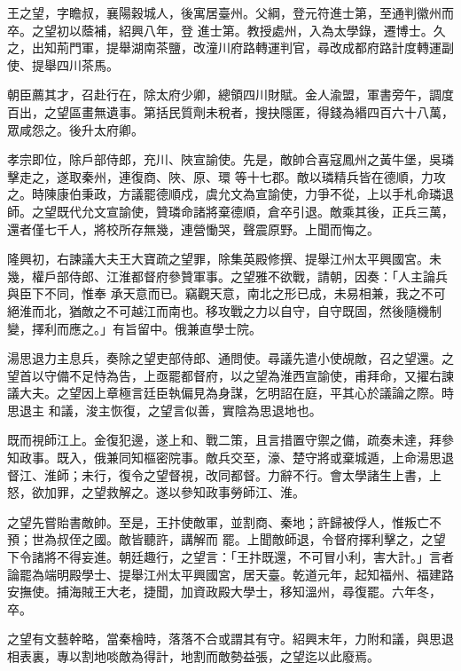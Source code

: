 \begin{pinyinscope}
 王之望，字瞻叔，襄陽穀城人，後寓居臺州。父綱，登元符進士第，至通判徽州而卒。之望初以蔭補，紹興八年，登
 進士第。教授處州，入為太學錄，遷博士。久之，出知荊門軍，提舉湖南茶鹽，改潼川府路轉運判官，尋改成都府路計度轉運副使、提舉四川茶馬。



 朝臣薦其才，召赴行在，除太府少卿，總領四川財賦。金人渝盟，軍書旁午，調度百出，之望區畫無遺事。第括民質劑未稅者，搜抉隱匿，得錢為緡四百六十八萬，眾咸怨之。後升太府卿。



 孝宗即位，除戶部侍郎，充川、陜宣諭使。先是，敵帥合喜寇鳳州之黃牛堡，吳璘擊走之，遂取秦州，連復商、陜、原、環
 等十七郡。敵以璘精兵皆在德順，力攻之。時陳康伯秉政，方議罷德順戍，虞允文為宣諭使，力爭不從，上以手札命璘退師。之望既代允文宣諭使，贊璘命諸將棄德順，倉卒引退。敵乘其後，正兵三萬，還者僅七千人，將校所存無幾，連營慟哭，聲震原野。上聞而悔之。



 隆興初，右諫議大夫王大寶疏之望罪，除集英殿修撰、提舉江州太平興國宮。未幾，權戶部侍郎、江淮都督府參贊軍事。之望雅不欲戰，請朝，因奏：「人主論兵與臣下不同，惟奉
 承天意而已。竊觀天意，南北之形已成，未易相兼，我之不可絕淮而北，猶敵之不可越江而南也。移攻戰之力以自守，自守既固，然後隨機制變，擇利而應之。」有旨留中。俄兼直學士院。



 湯思退力主息兵，奏除之望吏部侍郎、通問使。尋議先遣小使覘敵，召之望還。之望首以守備不足恃為告，上亟罷都督府，以之望為淮西宣諭使，甫拜命，又擢右諫議大夫。之望因上章極言廷臣執偏見為身謀，乞明詔在庭，平其心於議論之際。時思退主
 和議，浚主恢復，之望言似善，實陰為思退地也。



 既而視師江上。金復犯邊，遂上和、戰二策，且言措置守禦之備，疏奏未達，拜參知政事。既入，俄兼同知樞密院事。敵兵交至，濠、楚守將或棄城遁，上命湯思退督江、淮師；未行，復令之望督視，改同都督。力辭不行。會太學諸生上書，上怒，欲加罪，之望救解之。遂以參知政事勞師江、淮。



 之望先嘗貽書敵帥。至是，王抃使敵軍，並割商、秦地；許歸被俘人，惟叛亡不預；世為叔侄之國。敵皆聽許，講解而
 罷。上聞敵師退，令督府擇利擊之，之望下令諸將不得妄進。朝廷趣行，之望言：「王抃既還，不可冒小利，害大計。」言者論罷為端明殿學士、提舉江州太平興國宮，居天臺。乾道元年，起知福州、福建路安撫使。捕海賊王大老，捷聞，加資政殿大學士，移知溫州，尋復罷。六年冬，卒。



 之望有文藝幹略，當秦檜時，落落不合或謂其有守。紹興末年，力附和議，與思退相表裏，專以割地啖敵為得計，地割而敵勢益張，之望迄以此廢焉。




\end{pinyinscope}
